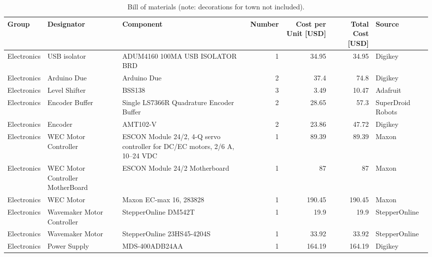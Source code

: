 \documentclass[hardware,article,submit,pdftex,moreauthors]{Definitions/mdpi}
\begin{document}
\startlandscape
\begin{table}[H]
\footnotesize
\caption{Bill of materials (note: decorations for town not included).}
\label{tab:bom}
\begin{tabularx}{\textwidth}{llLrrrl}
\toprule
\textbf{Group} & \textbf{Designator} & \textbf{Component} %
 & \textbf{Number} & \textbf{Cost per Unit {[}USD{]}} %
 & \textbf{Total Cost {[}USD{]}} & \textbf{Source} \\
\midrule
Electronics & USB isolator  & ADUM4160 100MA USB ISOLATOR BRD & 1 & 34.95 & 34.95 & Digikey \\
Electronics & Arduino Due & Arduino Due & 2 & 37.4  & 74.8  & Digikey \\
Electronics & Level Shifter & BSS138  & 3 & 3.49  & 10.47 & Adafruit  \\
Electronics & Encoder Buffer  & Single LS7366R Quadrature Encoder Buffer  & 2 & 28.65 & 57.3  & SuperDroid Robots \\
Electronics & Encoder & AMT102-V  & 2 & 23.86 & 47.72 & Digikey \\
Electronics & WEC Motor Controller  & ESCON Module 24/2, 4-Q servo controller for DC/EC motors, 2/6 A, 10--24 VDC & 1 & 89.39 & 89.39 & Maxon \\
Electronics & WEC Motor Controller MotherBoard  & ESCON Module 24/2 Motherboard & 1 & 87  & 87  & Maxon \\
Electronics & WEC Motor & Maxon EC-max 16, 283828 & 1 & 190.45  & 190.45  & Maxon \\
Electronics & Wavemaker Motor Controller  & StepperOnline DM542T  & 1 & 19.9  & 19.9  & StepperOnline \\
Electronics & Wavemaker Motor & StepperOnline 23HS45-4204S  & 1 & 33.92 & 33.92 & StepperOnline \\
Electronics & Power Supply  & MDS-400ADB24AA  & 1 & 164.19  & 164.19  & Digikey \\

\end{tabularx}
\end{table}
\end{document}
